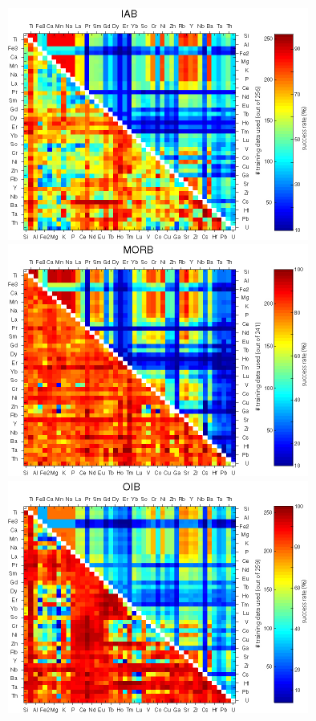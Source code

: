 \begin{figure}[htbp]
  \centering
  \includegraphics[width=300]{figures/xPlotTrace2_quadratic_IAB.jpg}
  \includegraphics[width=300]{figures/xPlotTrace2_quadratic_MORB.jpg}\\
  \includegraphics[width=300]{figures/xPlotTrace2_quadratic_OIB.jpg}

\end{figure}
